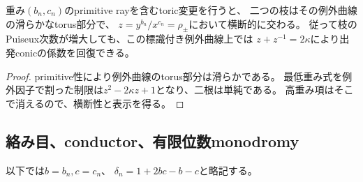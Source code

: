 \begin{corollary}[toric解消後に残る元の係数]
\label{cor:boundary-trace-recovered}
重み$(b_n,c_n)$のprimitive rayを含むtoric変更を行うと、
二つの枝はその例外曲線の滑らかなtorus部分で、
$z=y^{b_n}/x^{c_n}=\rho_\pm$において横断的に交わる。
従って枝のPuiseux次数が増大しても、この標識付き例外曲線上では
$z+z^{-1}=2\kappa$により出発conicの係数を回復できる。
\end{corollary}
\begin{proof}
primitive性により例外曲線のtorus部分は滑らかである。
最低重み式を例外因子で割った制限は$z^2-2\kappa z+1$となり、二根は単純である。
高重み項はそこで消えるので、横断性と表示を得る。
\end{proof}

\subsection{絡み目、conductor、有限位数monodromy}
以下では$b=b_n,c=c_n$、
$\delta_n=1+2bc-b-c$と略記する。

